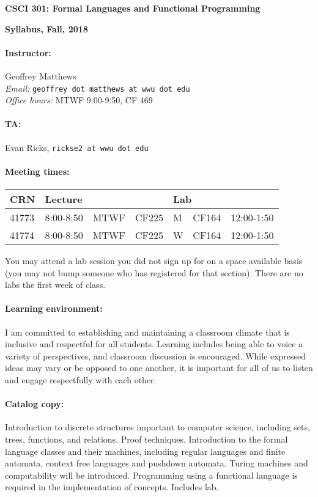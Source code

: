 \documentclass{article}
\begin{document}
\centerline{\Large\bf CSCI 301: Formal Languages and Functional Programming}
\centerline{\large\bf Syllabus, Fall, 2018}

\paragraph{Instructor:} Geoffrey Matthews\\
{\em Email:} {\tt geoffrey dot matthews at wwu dot edu}\\
{\em Office hours:} MTWF 9:00-9:50, CF 469

\paragraph{TA:} Evan Ricks, {\tt rickse2 at wwu dot edu}

\paragraph{Meeting times:} \mbox{}

  \begin{tabular}{l|lll|lll}
    CRN & \multicolumn{3}{l|}{Lecture}
    & \multicolumn{3}{|l}{Lab}
    \\\hline
    41773 & 8:00-8:50& MTWF & CF225 &  M & CF164 & 12:00-1:50
    \\
    41774 & 8:00-8:50& MTWF & CF225 &  W & CF164 & 12:00-1:50 
    \\\hline
    \end{tabular}
	
  You may attend a lab session you did not sign up for on a space
  available basis (you may not bump someone who has registered for
  that section).  There are no labs the first week of class.

\paragraph{Learning environment:}
  I am committed to establishing and maintaining a classroom climate that is
  inclusive and respectful for all students.  Learning includes being able to
  voice a variety of perspectives, and classroom discussion is encouraged. While
  expressed ideas may vary or be opposed to one another, it is important for all
  of us to listen and engage respectfully with each other.


\paragraph{Catalog copy:} Introduction to discrete structures important to
  computer science, including sets, trees, functions, and
  relations. Proof techniques. Introduction to the formal language
  classes and their machines, including regular languages and finite
  automata, context free languages and pushdown automata. Turing
  machines and computability will be introduced. Programming using a
  functional language is required in the implementation of
  concepts. Includes lab.
\end{document}
